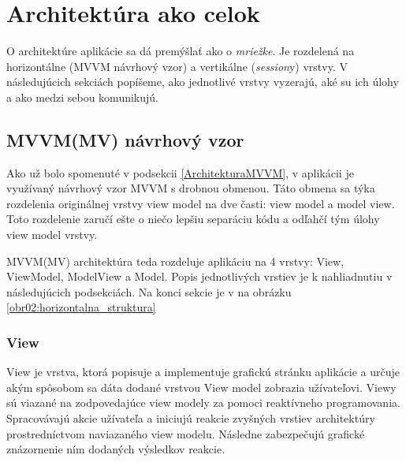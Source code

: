 \chapter{Architektúra ako celok}

O architektúre aplikácie sa dá premýšlať ako o \textit{mriežke}. Je rozdelená na horizontálne (MVVM návrhový vzor) a vertikálne (\textit{session}y) vrstvy. V následujúcich sekciách popíšeme, ako jednotlivé vrstvy vyzerajú, aké su ich úlohy a ako medzi sebou komunikujú.

\section{MVVM(MV) návrhový vzor}\label{MVVMNavrhovyVzor}

Ako už bolo spomenuté v podsekcii \ref{ArchitekturaMVVM}, v aplikácii je využívaný návrhový vzor MVVM s drobnou obmenou. Táto obmena sa týka rozdelenia originálnej vrstvy view model na dve časti: view model a model view. Toto rozdelenie zaručí ešte o niečo lepšiu separáciu kódu a odľahčí tým úlohy view model vrstvy.  

MVVM(MV) architektúra teda rozdeluje aplikáciu na 4 vrstvy: View, ViewModel, ModelView a Model. Popis jednotlivých vrstiev je k nahliadnutiu v následujúcich podsekciách. Na konci sekcie je v na obrázku \ref{obr02:horizontalna_struktura}

\subsection{View}

View je vrstva, ktorá popisuje a implementuje grafickú stránku aplikácie a určuje akým spôsobom sa dáta dodané vrstvou View model zobrazia užívateľovi. Viewy sú viazané na zodpovedajúce view modely za pomoci reaktívneho programovania. Spracovávajú akcie užívateľa a iniciujú reakcie zvyšných vrstiev architektúry prostredníctvom naviazaného view modelu. Následne zabezpečujú grafické znázornenie ním dodaných výsledkov reakcie.


